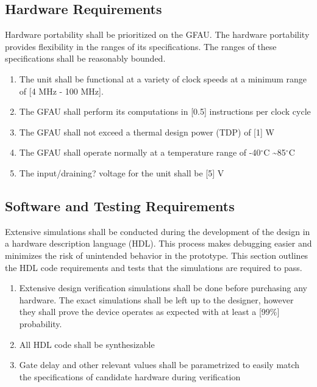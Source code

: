 \documentclass[12pt]{extarticle}
\begin{document}
        \subsection{Hardware Requirements} Hardware portability shall be
        prioritized on the GFAU. The hardware portability provides flexibility
        in the ranges of its specifications. The ranges of these specifications
        shall be reasonably bounded.

        \begin{enumerate}

            \item The unit shall be functional at a variety of clock speeds at
            a minimum range of [4 MHz - 100 MHz].

            \item The GFAU shall perform its computations in [0.5] instructions
            per clock cycle

            \item The GFAU shall not exceed a thermal design power (TDP) of [1]
            W

            \item The GFAU shall operate normally at a temperature range of
            -40$^{\circ}$C \textasciitilde 85$^{\circ}$C

            \item The input/draining? voltage for the unit shall be [5] V

        \end{enumerate}

        \subsection{Software and Testing Requirements} Extensive simulations
        shall be conducted during the development of the design in a hardware
        description language (HDL). This process makes debugging easier and
        minimizes the risk of unintended behavior in the prototype. This
        section outlines the HDL code requirements and tests that the
        simulations are required to pass.

        \begin{enumerate}

            \item Extensive design verification simulations shall be done
            before purchasing any hardware. The exact simulations shall be left
            up to the designer, however they shall prove the device operates as
            expected with at least a [99\%] probability.

            \item All HDL code shall be synthesizable

            \item Gate delay and other relevant values shall be parametrized to
            easily match the specifications of candidate hardware during
            verification

        \end{enumerate}
\end{document}
